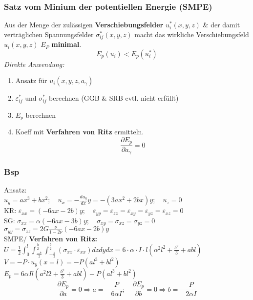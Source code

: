         \subsubsection{Satz vom Minium der potentiellen Energie (SMPE)}
            Aus der Menge der zulässigen \textbf{Verschiebungsfelder} $u_i^*(x,y,z)$ \& der damit verträglichen Spannungsfelder $\sigma_{ij}^*(x,y,z)$ macht das wirkliche Verschiebungsfeld $u_i(x,y,z)$ $E_P$ \textbf{minimal}.
            \[E_p(u_i) < E_p(u_i^*)\]
            \textit{Direkte Anwendung:}
            \begin{enumerate}
                \item Ansatz für $u_i(x,y,z,a_{\gamma})$
                \item $\varepsilon_{ij}^*$ und $\sigma_{ij}^*$ berechnen (GGB \& SRB evtl. nicht erfüllt)
                \item $E_p$ berechnen
                \item Koeff mit \textbf{Verfahren von Ritz} ermitteln.
                \[\frac{\partial E_p}{\partial a_{\gamma}} =0\]
            \end{enumerate}
            
        \subsubsection{Bsp}
            Ansatz:\\
            $u_y=ax^3+bx^2; \quad u_x=-\frac{du_y}{dx}y= -(3ax^2+2bx)y; \quad u_z = 0$\\
            KR: $\varepsilon_{xx} =(-6ax-2b)y; \quad \varepsilon_{yy}=\varepsilon_{zz}=\varepsilon_{xy}=\varepsilon_{yz} = \varepsilon_{xz}=0$\\
            SG: $\sigma_{xx} = \alpha(-6ax-3b)y; \quad \sigma_{xy}=\sigma_{xz}=\sigma_{yz}=0$\\ $\sigma_{yy}=\sigma_{zz}=2G\frac{\nu}{1-2\nu}(-6ax-2b)y$\\
            SMPE/ \textbf{Verfahren von Ritz:}\\
            $U=\frac{1}{2}\int_0^l\int_\frac{-h}{2}^\frac{h}{2}\int_{-\frac{b}{2}}^\frac{b}{2}(\sigma_{xx}\cdot\varepsilon_{xx})dzdydx=6\cdot\alpha\cdot I\cdot l(\alpha^2l^2+\frac{b^2}{3}+abl)$\\
            $V=-P\cdot u_y(x=l)=-P(al^3+bl^2)$\\
            $E_p=6\alpha Il(a^2l2+\frac{b^2}{3}+abl)-P(al^3+bl^2)$
            \small\[\frac{\partial E_p}{\partial a} = 0 \Rightarrow a=-\frac{P}{6\alpha I};\quad\frac{\partial E_p}{\partial b} = 0 \Rightarrow b=-\frac{P}{2\alpha I}\]\normalsize
        \vspace{-3mm}    
        

